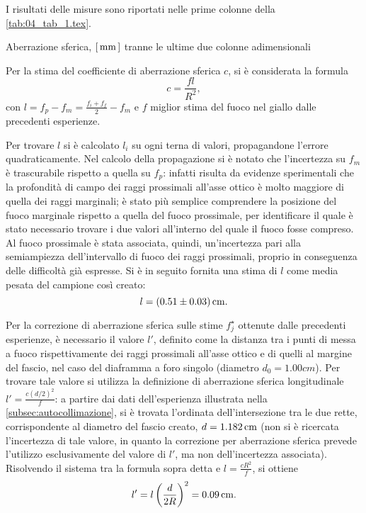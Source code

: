 
I risultati delle misure sono riportati nelle prime colonne della \autoref{tab:04_tab_1.tex}.
\begin{tabella}
	\centering
	
	\caption{Aberrazione sferica, $[\,\mathrm{mm}\,]$ tranne le ultime due colonne adimensionali}
	\label{tab:04_tab_1.tex}
\end{tabella}
%
Per la stima del coefficiente di aberrazione sferica $c$, si \`e considerata la formula
\[ c=\frac{f   l}{R^2}, \] 
con \( l = f_p - f_m = \frac{f_i + f_f}{2} - f_m \) e $f$ miglior stima del fuoco nel giallo dalle precedenti esperienze.


Per trovare $l$ si \`e calcolato $l_i$ su ogni terna di valori, propagandone l'errore quadraticamente. Nel calcolo della propagazione si \`e notato che l'incertezza su $f_m$ è trascurabile rispetto a quella su $f_p$: infatti risulta da evidenze sperimentali che la profondità di campo dei raggi prossimali all'asse ottico \`e molto maggiore di quella dei raggi marginali; è stato più semplice comprendere la posizione del fuoco marginale rispetto a quella del fuoco prossimale, per identificare il quale è stato necessario trovare i due valori all'interno del quale il fuoco fosse compreso. Al fuoco prossimale è stata associata, quindi, un'incertezza pari alla semiampiezza dell'intervallo di fuoco dei raggi prossimali, proprio in conseguenza delle difficolt\`a già espresse. Si \`e in seguito fornita una stima di $l$ come media pesata del campione cos\`i creato:
\[ l = (0.51 \pm 0.03) \,\mathrm{cm}. \]


Per la correzione di aberrazione sferica sulle stime $f^{\star}_j$ ottenute dalle precedenti esperienze, \`e necessario il valore $ l'$, definito come la distanza tra i punti di messa a fuoco rispettivamente dei raggi prossimali all'asse ottico e di quelli al margine del fascio, nel caso del diaframma a foro singolo (diametro $d_0=1.00 cm$). Per trovare tale valore si utilizza la definizione di aberrazione sferica longitudinale $l'=\frac{c(d/2)^2}{f}$: a partire dai dati dell'esperienza illustrata nella \autoref{subsec:autocollimazione}, si \`e trovata l'ordinata dell'intersezione tra le due rette, corrispondente al diametro del fascio creato, $d= 1.182 \,\mathrm{cm}$ (non si \`e ricercata l'incertezza di tale valore, in quanto la correzione per aberrazione sferica prevede l'utilizzo esclusivamente del valore di $l'$, ma non dell'incertezza associata). Risolvendo il sistema tra la formula sopra detta e $l=\frac{cR^2}{f}$, si ottiene
\[l' = l\left(\frac{d}{2R}\right)^2 = 0.09\,\mathrm{cm} .\]


